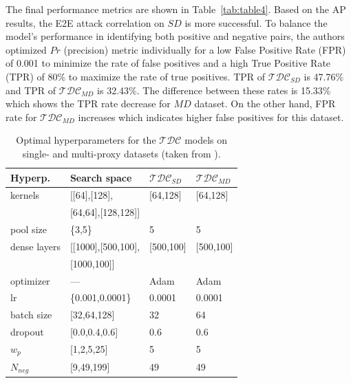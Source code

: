 \documentclass[sigconf]{acmart}
\begin{document}
The final performance metrics are shown in Table~\ref{tab:table4}. Based on the AP results, the E2E attack correlation on $SD$ is more successful. To balance the model's performance in identifying both positive and negative pairs, the authors optimized $Pr$ (precision) metric individually for a low False Positive Rate (FPR) of 0.001 to minimize the rate of false positives and a high True Positive Rate (TPR) of 80\% to maximize the rate of true positives. TPR of \(\mathcal{TDC}\)$_{SD}$ is 47.76\% and TPR of \(\mathcal{TDC}\)$_{MD}$ is 32.43\%. The difference between these rates is 15.33\% which shows the TPR rate decrease for $MD$ dataset. On the other hand, FPR rate for \(\mathcal{TDC}\)$_{MD}$ increases which indicates higher false positives for this dataset. 





\begin{table}[h]
  \begin{center}
    \begin{tabular}{l|l|l|l}
      \toprule %
      \textbf{Hyperp.} & \textbf{Search space} & \( \mathcal{TDC} \)$_{SD}$ & \( \mathcal{TDC} \)$_{MD}$ \\
      \midrule %
      kernels & [[64],[128], & [64,128] & [64,128]\\
              & [64,64],[128,128]] &  &  \\
      pool size & \{3,5\} & 5 & 5\\
      dense layers & [[1000],[500,100],  & [500,100] & [500,100]\\
                   &  [1000,100]] &   &  \\
      optimizer & { }---{ } & Adam & Adam\\
      lr & \{0.001,0.0001\} & 0.0001 & 0.0001\\
      batch size & [32,64,128] & 32 & 64\\
      dropout & [0.0,0.4,0.6] & 0.6 & 0.6\\
      $w_{p}$ & [1,2,5,25] & 5 & 5\\
      $N_{neg}$  & [9,49,199] & 49 & 49\\
      \bottomrule %
    \end{tabular}
    \caption{\textmd{Optimal hyperparameters for the \( \mathcal{TDC} \) models on single- and multi-proxy datasets (taken from \cite{RimmerV}).}}
    \label{tab:table2}
  \end{center}
\end{table}
\end{document}
